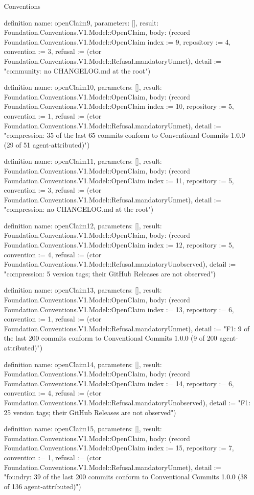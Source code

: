 \begin{lexlean}{Conventions}
\begin{semanticmodule}
definition{
  name: openClaim9,
  parameters: [],
  result: Foundation.Conventions.V1.Model::OpenClaim,
  body: (record Foundation.Conventions.V1.Model::OpenClaim {index := 9, repository := 4, convention := 3, refusal := (ctor Foundation.Conventions.V1.Model::Refusal.mandatoryUnmet), detail := "community: no CHANGELOG.md at the root"})
}

definition{
  name: openClaim10,
  parameters: [],
  result: Foundation.Conventions.V1.Model::OpenClaim,
  body: (record Foundation.Conventions.V1.Model::OpenClaim {index := 10, repository := 5, convention := 1, refusal := (ctor Foundation.Conventions.V1.Model::Refusal.mandatoryUnmet), detail := "compression: 35 of the last 65 commits conform to Conventional Commits 1.0.0 (29 of 51 agent-attributed)"})
}

definition{
  name: openClaim11,
  parameters: [],
  result: Foundation.Conventions.V1.Model::OpenClaim,
  body: (record Foundation.Conventions.V1.Model::OpenClaim {index := 11, repository := 5, convention := 3, refusal := (ctor Foundation.Conventions.V1.Model::Refusal.mandatoryUnmet), detail := "compression: no CHANGELOG.md at the root"})
}

definition{
  name: openClaim12,
  parameters: [],
  result: Foundation.Conventions.V1.Model::OpenClaim,
  body: (record Foundation.Conventions.V1.Model::OpenClaim {index := 12, repository := 5, convention := 4, refusal := (ctor Foundation.Conventions.V1.Model::Refusal.mandatoryUnobserved), detail := "compression: 5 version tags; their GitHub Releases are not observed"})
}

definition{
  name: openClaim13,
  parameters: [],
  result: Foundation.Conventions.V1.Model::OpenClaim,
  body: (record Foundation.Conventions.V1.Model::OpenClaim {index := 13, repository := 6, convention := 1, refusal := (ctor Foundation.Conventions.V1.Model::Refusal.mandatoryUnmet), detail := "F1: 9 of the last 200 commits conform to Conventional Commits 1.0.0 (9 of 200 agent-attributed)"})
}

definition{
  name: openClaim14,
  parameters: [],
  result: Foundation.Conventions.V1.Model::OpenClaim,
  body: (record Foundation.Conventions.V1.Model::OpenClaim {index := 14, repository := 6, convention := 4, refusal := (ctor Foundation.Conventions.V1.Model::Refusal.mandatoryUnobserved), detail := "F1: 25 version tags; their GitHub Releases are not observed"})
}

definition{
  name: openClaim15,
  parameters: [],
  result: Foundation.Conventions.V1.Model::OpenClaim,
  body: (record Foundation.Conventions.V1.Model::OpenClaim {index := 15, repository := 7, convention := 1, refusal := (ctor Foundation.Conventions.V1.Model::Refusal.mandatoryUnmet), detail := "foundry: 39 of the last 200 commits conform to Conventional Commits 1.0.0 (38 of 136 agent-attributed)"})
}


\end{semanticmodule}
\end{lexlean}
